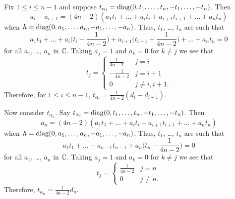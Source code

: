 Fix $1\leq i\leq n-1$ and suppose $t_{\alpha_i}= {\operatorname{diag}(0,t_1,\dots,t_n,
  -t_1,\dots,-t_n)}$. Then
\begin{equation*}
  a_i-a_{i+1}= (4n-2)(a_1t_1+\dots+a_it_i+a_{i+1}t_{i+1}+ \dots +a_nt_n)
\end{equation*}
when $h={\operatorname{diag}(0,a_1,\dots,a_n, -a_1,\dots,-a_n)}$. Thus, $t_1$, \dots, $t_n$ are such that
\begin{equation*}
  \textstyle a_1t_1+\dots+a_i\big(t_i- \frac 1{4n-2} \big) +a_{i+1}
  \big(t_{i+1} +\frac 1{4n-2} \big)+  \dots +a_nt_n=0 
\end{equation*}
for all $a_1$, \dots, $a_n$ in ${\mathbb C}$. Taking $a_j=1$ and $a_k=0$ for $k\ne
j$ we see that
\[
t_j= \begin{cases} \textstyle \frac 1{4n-2}&j=i \\ -\frac 1{4n-2} &j=i+1 \\0
  &j\ne i, i+1. \end{cases}
\]
Therefore, for $1\leq i\leq n-1$, $t_{\alpha_i}=\frac 1{4n-2}( d_i-
d_{i+1})$.

Now consider $t_{\alpha_n}$. Say $t_{\alpha_i}= {\operatorname{diag}(0,t_1,\dots,t_n,
  -t_1,\dots,-t_n)}$. Then
\begin{equation*}
  a_n= (4n-2)(a_1t_1+\dots+a_it_i+a_{i+1}t_{i+1}+ \dots +a_nt_n)
\end{equation*}
when $h={\operatorname{diag}(0,a_1,\dots,a_n, -a_1,\dots,-a_n)}$. Thus, $t_1$, \dots, $t_n$ are such that
\begin{equation*}
  \textstyle  a_1t_1+\dots+a_{n-1} t_{n-1} +a_n\big(t_n-\frac 1{4n-2}\big)=0 
\end{equation*}
for all $a_1$, \dots, $a_n$ in ${\mathbb C}$. Taking $a_j=1$ and $a_k=0$ for $k\ne
j$ we see that
\[
t_j= \begin{cases} \textstyle \frac 1{4n-2}&j=n \\ 0 &j\ne n. \end{cases}
\]
Therefore, $t_{\alpha_n}=\frac 1{4n-2} d_n$.
